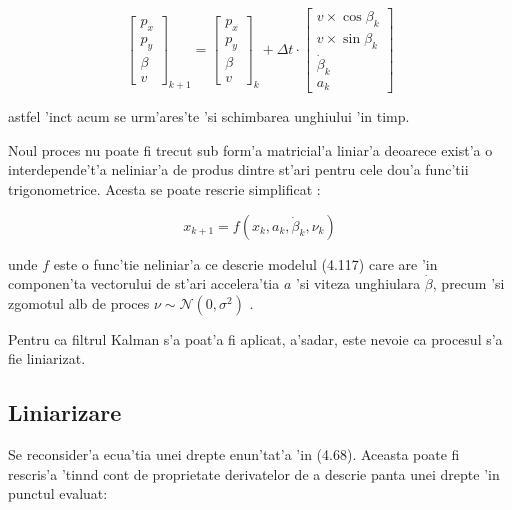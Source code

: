 \documentclass[12pt,a4paper,twoside]{report}
\begin{document}
\begin{equation}
    \begin{bmatrix} p_x \\ p_y \\ \beta \\ v \end{bmatrix}_{k+1}  = \begin{bmatrix} p_x \\ p_y \\ \beta\\ v \end{bmatrix}_{k} + \Delta t \cdot \begin{bmatrix} v \times \cos{\beta_k} \\ v \times \sin{\beta_k} \\ \dot \beta_k \\ a_k \end{bmatrix} 
\end{equation}

astfel 'inc\ia t acum se urm'ares'te 'si schimbarea unghiului 'in timp.

\vspace{5px}

Noul proces nu poate fi trecut sub form'a matricial'a liniar'a deoarece exist'a o interdepende't'a neliniar'a de produs dintre st'ari pentru cele dou'a func'tii trigonometrice. Acesta se poate rescrie simplificat \cite{5164334}: 

\begin{equation}
    x_{k+1} = f(x_k, a_k, \dot \beta_k, \nu_k)
\end{equation}

unde $f$ este o func'tie neliniar'a ce descrie modelul (4.117) care are 'in componen'ta vectorului de st'ari accelera'tia $a$ 'si viteza unghiulara $\dot \beta$, precum 'si zgomotul alb de proces $\nu \sim \mathcal{N}(0,\sigma^2) $ .

\vspace{5px}

Pentru ca filtrul Kalman s'a poat'a fi aplicat, a'sadar, este nevoie ca procesul s'a fie liniarizat. 


\subsection{Liniarizare}

Se reconsider'a ecua'tia unei drepte enun'tat'a 'in (4.68). Aceasta poate fi rescris'a 'tin\ia nd cont de proprietate derivatelor de a descrie panta unei drepte 'in punctul evaluat:
\end{document}
